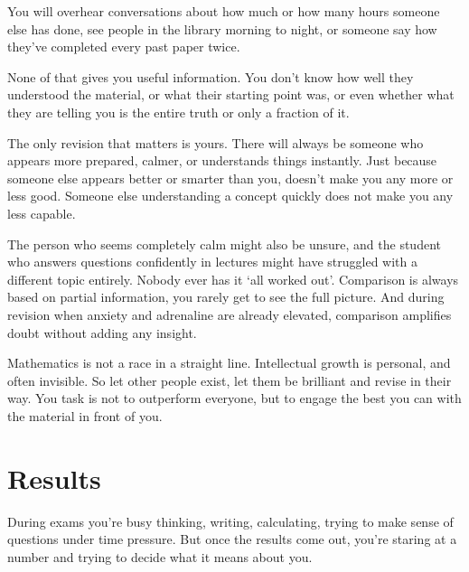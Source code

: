 You will overhear conversations about how much or how many hours someone else has done, see people in the library morning to night, or someone say how they've completed every past paper twice. 

None of that gives you useful information. You don't know how well they understood the material, or what their starting point was, or even whether what they are telling you is the entire truth or only a fraction of it. 

The only revision that matters is yours. There will always be someone who appears more prepared, calmer, or understands things instantly. Just because someone else appears better or smarter than you, doesn't make you any more or less good. Someone else understanding a concept quickly does not make you any less capable. 

The person who seems completely calm might also be unsure, and the student who answers questions confidently in lectures might have struggled with a different topic entirely. Nobody ever has it `all worked out'. Comparison is always based on partial information, you rarely get to see the full picture. And during revision when anxiety and adrenaline are already elevated, comparison amplifies doubt without adding any insight. 

Mathematics is not a race in a straight line. Intellectual growth is personal, and often invisible. So let other people exist, let them be brilliant and revise in their way. You task is not to outperform everyone, but to engage the best you can with the material in front of you. 

\section{Results}


During exams you’re busy thinking, writing, calculating, trying to make sense of questions under time pressure. But once the results come out, you're staring at a number and trying to decide what it means about you. 

